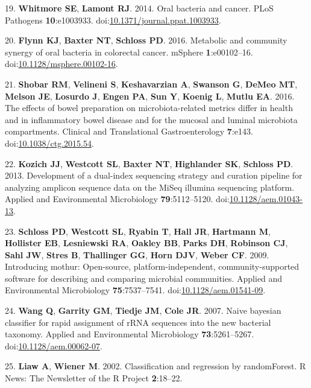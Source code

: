 \documentclass[11pt,]{article}
\begin{document}
\hypertarget{ref-Whitmore2014}{}
19. \textbf{Whitmore SE}, \textbf{Lamont RJ}. 2014. Oral bacteria and
cancer. PLoS Pathogens \textbf{10}:e1003933.
doi:\href{https://doi.org/10.1371/journal.ppat.1003933}{10.1371/journal.ppat.1003933}.

\hypertarget{ref-Flynn2016}{}
20. \textbf{Flynn KJ}, \textbf{Baxter NT}, \textbf{Schloss PD}. 2016.
Metabolic and community synergy of oral bacteria in colorectal cancer.
mSphere \textbf{1}:e00102--16.
doi:\href{https://doi.org/10.1128/msphere.00102-16}{10.1128/msphere.00102-16}.

\hypertarget{ref-Shobar2016}{}
21. \textbf{Shobar RM}, \textbf{Velineni S}, \textbf{Keshavarzian A},
\textbf{Swanson G}, \textbf{DeMeo MT}, \textbf{Melson JE},
\textbf{Losurdo J}, \textbf{Engen PA}, \textbf{Sun Y}, \textbf{Koenig
L}, \textbf{Mutlu EA}. 2016. The effects of bowel preparation on
microbiota-related metrics differ in health and in inflammatory bowel
disease and for the mucosal and luminal microbiota compartments.
Clinical and Translational Gastroenterology \textbf{7}:e143.
doi:\href{https://doi.org/10.1038/ctg.2015.54}{10.1038/ctg.2015.54}.

\hypertarget{ref-Kozich2013}{}
22. \textbf{Kozich JJ}, \textbf{Westcott SL}, \textbf{Baxter NT},
\textbf{Highlander SK}, \textbf{Schloss PD}. 2013. Development of a
dual-index sequencing strategy and curation pipeline for analyzing
amplicon sequence data on the MiSeq illumina sequencing platform.
Applied and Environmental Microbiology \textbf{79}:5112--5120.
doi:\href{https://doi.org/10.1128/aem.01043-13}{10.1128/aem.01043-13}.

\hypertarget{ref-Schloss2009}{}
23. \textbf{Schloss PD}, \textbf{Westcott SL}, \textbf{Ryabin T},
\textbf{Hall JR}, \textbf{Hartmann M}, \textbf{Hollister EB},
\textbf{Lesniewski RA}, \textbf{Oakley BB}, \textbf{Parks DH},
\textbf{Robinson CJ}, \textbf{Sahl JW}, \textbf{Stres B},
\textbf{Thallinger GG}, \textbf{Horn DJV}, \textbf{Weber CF}. 2009.
Introducing mothur: Open-source, platform-independent,
community-supported software for describing and comparing microbial
communities. Applied and Environmental Microbiology
\textbf{75}:7537--7541.
doi:\href{https://doi.org/10.1128/aem.01541-09}{10.1128/aem.01541-09}.

\hypertarget{ref-Wang2007}{}
24. \textbf{Wang Q}, \textbf{Garrity GM}, \textbf{Tiedje JM},
\textbf{Cole JR}. 2007. Naive bayesian classifier for rapid assignment
of rRNA sequences into the new bacterial taxonomy. Applied and
Environmental Microbiology \textbf{73}:5261--5267.
doi:\href{https://doi.org/10.1128/aem.00062-07}{10.1128/aem.00062-07}.

\hypertarget{ref-Liaw2002}{}
25. \textbf{Liaw A}, \textbf{Wiener M}. 2002. Classification and
regression by randomForest. R News: The Newsletter of the R Project
\textbf{2}:18--22.
\end{document}

